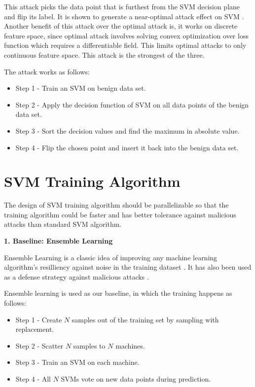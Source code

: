 \documentclass[10pt,conference,compsocconf,letterpaper]{IEEEtran}
\begin{document}
This attack picks the data point that is furthest from the SVM decision plane and flip its label. It is shown to generate a near-optimal attack effect on SVM \cite{xiao12}. Another benefit of this attack over the optimal attack is, it works on discrete feature space, since optimal attack involves solving convex optimization over loss function which requires a differentiable field. This limits optimal attacks to only continuous feature space. This attack is the strongest of the three.

The attack works as follows:

\begin{itemize}
\item Step 1 - Train an SVM on benign data set.
\item Step 2 - Apply the decision function of SVM on all data points of the benign data set.
\item Step 3 - Sort the decision values and find the maximum in absolute value.
\item Step 4 - Flip the chosen point and insert it back into the benign data set.
\end{itemize}

\section{SVM Training Algorithm}

The design of SVM training algorithm should be parallelizable so that the training algorithm could be faster and has better tolerance against malicious attacks than standard SVM algorithm.

\textbf{1. Baseline: Ensemble Learning}

Ensemble Learning is a classic idea of improving any machine learning algorithm's resilliency against noise in the training dataset \cite{leo96, dong05}. It has also been used as a defense strategy against malicious attacks \cite{marco08, gabriela08}. 

Ensemble learning is used as our baseline, in which the training happens as follows:

\begin{itemize}
\item Step 1 - Create $N$ samples out of the training set by sampling with replacement.
\item Step 2 - Scatter $N$ samples to $N$ machines.
\item Step 3 - Train an SVM on each machine.
\item Step 4 - All $N$ SVMs vote on new data points during prediction.
\end{itemize}
\end{document}
